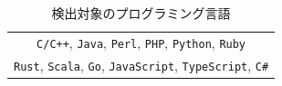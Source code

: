 \documentclass[T,J]{fose}
\begin{document}
\begin{table}[tb]
    \centering
    \caption{検出対象のプログラミング言語}
    \label{table:detectLanguages}
    \begin{tabular}{c}
        \hline
        \verb|C/C++|, \verb|Java|, \verb|Perl|, \verb|PHP|, \verb|Python|, \verb|Ruby| \\
        \verb|Rust|, \verb|Scala|, \verb|Go|, \verb|JavaScript|, \verb|TypeScript|, \verb|C#| \\
        \hline
    \end{tabular}
\end{table}

\end{document}
